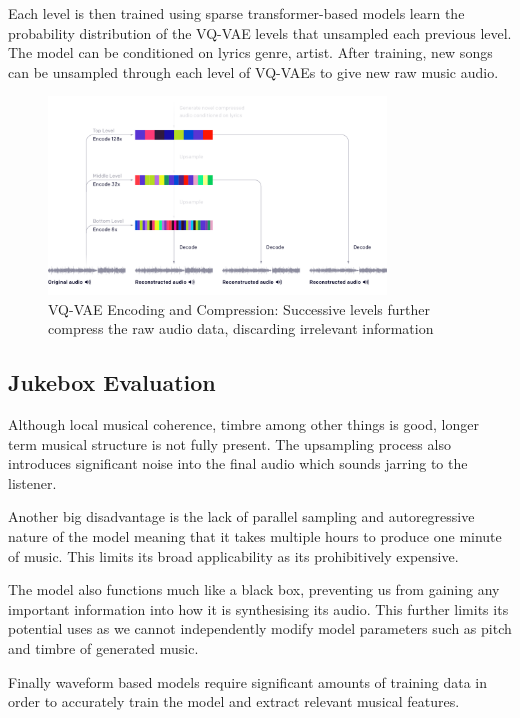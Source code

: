 Each level is then trained using sparse transformer-based models learn the probability distribution of the VQ-VAE levels that unsampled each previous level. The model can be conditioned on lyrics genre, artist. After training, new songs can be unsampled through each level of VQ-VAEs to give new raw music audio.

\begin{figure}
    \centering
    \includegraphics[width=0.8\textwidth]{literature_review/vq-vae.png}
    \caption{VQ-VAE Encoding and Compression: Successive levels further compress the raw audio data, discarding irrelevant information}
    \label{fig:jukebox_example}
\end{figure}

\subsection{Jukebox Evaluation}

Although local musical coherence, timbre among other things is good, longer term musical structure is not fully present. The upsampling process also introduces significant noise into the final audio which sounds jarring to the listener.

Another big disadvantage is the lack of parallel sampling and autoregressive nature of the model meaning that it takes multiple hours to produce one minute of music. This limits its broad applicability as its prohibitively expensive.

The model also functions much like a black box, preventing us from gaining any important information into how it is synthesising its audio. This further limits its potential uses as we cannot independently modify model parameters such as pitch and timbre of generated music.

Finally waveform based models require significant amounts of training data in order to accurately train the model and extract relevant musical features.

